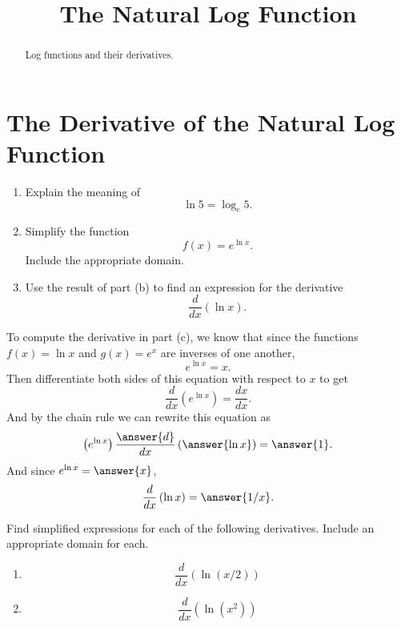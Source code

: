 \documentclass{ximera}
\title{The Natural Log Function}
\begin{document}
\begin{abstract}
Log functions and their derivatives.
\end{abstract}
\maketitle


\section{The Derivative of the Natural Log Function}
\begin{question} \label{Qdfggghghhfll}

\begin{enumerate}
\item Explain the meaning of 
\[
  \ln 5 = \log_e 5 .
\]

\item Simplify the function
\[
     f(x) = e^{\ln x} .
\]
Include the appropriate domain.

\item Use the result of part (b) to find an expression for the derivative
\[
 \frac{d}{dx} \left(  \ln x \right ) .
\]
\end{enumerate}

\begin{explanation}
To compute the derivative in part (c), we know that since the functions $f(x)=\ln x$ and $g(x)=e^x$ are inverses of one another,
\[
    e^{\ln x} = x .
\]
Then differentiate both sides of this equation with respect to $x$ to get
\[
        \frac{d}{dx} \left(  e^{\ln x} \right) = \frac{dx}{dx} .
\]
And by the chain rule we can rewrite this equation as
\[
         \left(  e^{\ln x} \right)   \frac{\answer{d}}{dx} \left(  \answer{\ln x} \right) = \answer{1} . 
\]
And since $e^{\ln x} = \answer{x}$, 
\[
         \frac{d}{dx} \left(  \ln x  \right) = \answer{1/x}.
\]
\end{explanation}

\end{question}

\begin{question} \label{Qhhghgfgfdgghhfll}
Find simplified expressions for each of the following derivatives. Include an appropriate domain for each.

\begin{enumerate}
\item 
\[
   \frac{d}{dx} \left( \ln \left( x/2 \right) \right)
\]

\item 
\[
\frac{d}{dx} \left( \ln \left( x^2 \right) \right)
\]
\end{enumerate}

\end{question}
\end{document}
